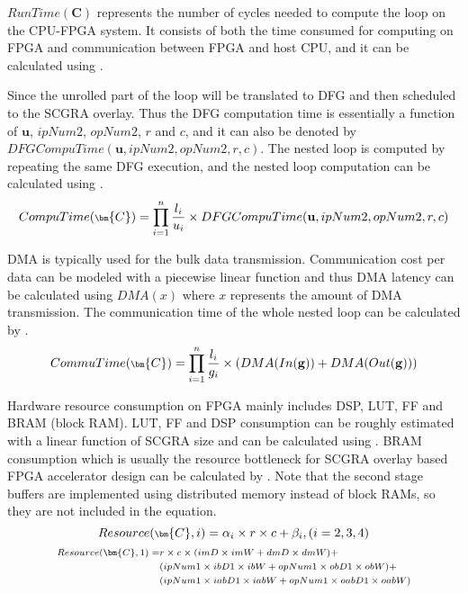 $RunTime(\bm{C})$ represents the number of cycles needed to compute the loop on 
the CPU-FPGA system. It consists of both the time consumed for computing on FPGA and 
communication between FPGA and host CPU, and it can be calculated using .

Since the unrolled part of the loop will be translated to 
DFG and then scheduled to the SCGRA overlay. Thus the DFG computation time 
is essentially a function of $\mathbf{u}$, $ipNum2$, $opNum2$, $r$ and $c$, and it can also be 
denoted by $DFGCompuTime(\mathbf{u}, ipNum2, opNum2, r, c)$.
The nested loop is computed by repeating the same DFG execution, and the 
nested loop computation can be calculated using .
\begin{equation} \label{eq:loopexetime}
    \scriptsize
    CompuTime(\bm{C})=\displaystyle \prod_{i=1}^{n} \frac{l_i}{u_i} \times
    DFGCompuTime(\mathbf{u}, ipNum2, opNum2, r,c)
\end{equation}

DMA is typically used for the bulk data transmission. Communication cost per 
data can be modeled with a piecewise linear function and thus DMA latency can be 
calculated using $DMA(x)$ where $x$ represents the amount of DMA transmission. The communication
time of the whole nested loop can be calculated by .
\begin{equation} \label{eq:commu}
    \scriptsize
    CommuTime(\bm{C})=\displaystyle \prod_{i=1}^{n} \frac{l_i}{g_i} \times 
    (DMA(In(\mathbf{g}))+DMA(Out(\mathbf{g})))
\end{equation}

Hardware resource consumption on FPGA mainly includes DSP, LUT, FF and 
BRAM (block RAM). LUT, FF and DSP consumption can be roughly estimated 
with a linear function of SCGRA size and can be calculated using . 
BRAM consumption which is usually the resource bottleneck for SCGRA overlay based 
FPGA accelerator design can be calculated by . Note that the second stage
buffers are implemented using distributed memory instead of block RAMs, so they are not included in
the equation.
\begin{equation} \label{eq:dsplutff}
    \scriptsize
    Resource(\bm{C}, i)=\alpha_i \times r \times c + \beta_i, (i=2,3,4)
\end{equation}
\begin{equation} \label{eq:bramoverhead}
    \scriptsize
    \begin{split}
        Resource(\bm{C}, 1)=&r \times c \times (imD \times imW + dmD \times dmW) + \\ 
                            &(ipNum1 \times ibD1 \times ibW + opNum1 \times obD1 \times obW) + \\
                               &(ipNum1 \times iabD1 \times iabW + opNum1 \times oabD1 \times oabW) 
    \end{split}
\end{equation}
